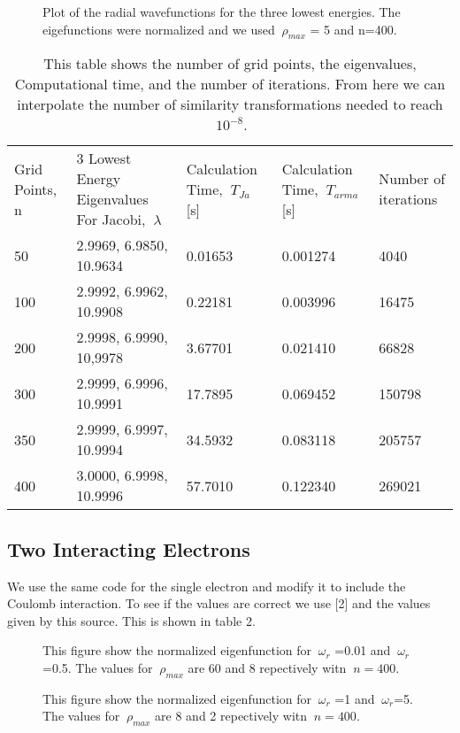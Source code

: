 \documentclass[11pt,a4wide]{article}
\begin{document}
\begin{figure}[H] 
\centering
\caption{ Plot of the radial wavefunctions for the three lowest energies. The eigefunctions were normalized and we used $\ \rho_{max}$ = 5 and n=400.\label{overflow}}
\end{figure}
\begin{table}[H]
\centering
\label{my-label}
\begin{tabular}{| m{2cm} | m{3cm} | m{3cm} | m{3cm} | m{3cm} |}
 \cline{1-5}
  Grid Points, n&  3 Lowest Energy Eigenvalues For Jacobi, $\ \lambda$&  Calculation Time, $\ T_{Ja}$ [s]&   Calculation Time, $\ T_{arma}$ [s]& Number of iterations \\ \cline{1-5}
 50&  2.9969, 6.9850, 10.9634&  0.01653& 0.001274& 4040\\ \cline{1-5}
 100& 2.9992, 6.9962, 10.9908&  0.22181& 0.003996& 16475\\ \cline{1-5}
 200& 2.9998, 6.9990, 10,9978&  3.67701& 0.021410& 66828\\ \cline{1-5}
 300& 2.9999, 6.9996, 10.9991&  17.7895& 0.069452& 150798\\ \cline{1-5}
 350& 2.9999, 6.9997, 10.9994&  34.5932& 0.083118& 205757\\ \cline{1-5}
 400& 3.0000, 6.9998, 10.9996&  57.7010& 0.122340& 269021\\ \cline{1-5}
\end{tabular}
\caption{This table shows the number of grid points, the eigenvalues, Computational time, and the number of iterations. From here we can interpolate the number of similarity transformations needed to reach $\ 10^{-8}$.  }
\end{table}

\subsection{Two Interacting Electrons}
We use the same code for the single electron and modify it to include the Coulomb interaction. To see if the values are correct we use [2] and the values given by this source. This is shown in table 2.
\begin{figure}[H]
\centering
\caption{This figure show the normalized eigenfunction for $\ \omega_r$ =0.01 and $\ \omega_r$=0.5. The values for $\ \rho_{max}$ are 60 and 8 repectively witn $\ n=400$. \label{overflow}}
\end{figure}
\begin{figure}[H]
\centering
\caption{This figure show the normalized eigenfunction for $\ \omega_r$ =1 and $\ \omega_r$=5. The values for $\ \rho_{max}$ are 8 and 2 repectively witn $\ n=400$. \label{overflow}}
\end{figure}
\end{document}
